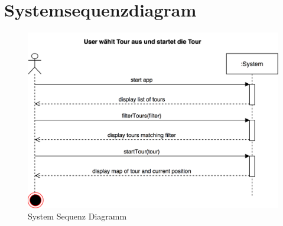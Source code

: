\documentclass[a4paper,10pt,xetex]{article}
\begin{document}
\section{Systemsequenzdiagram}\label{systemsequenzdiagram}

\begin{figure}
\centering
\includegraphics{UC1_SystemSequenzDiagram}
\caption{System Sequenz Diagramm}
\end{figure}
\end{document}
